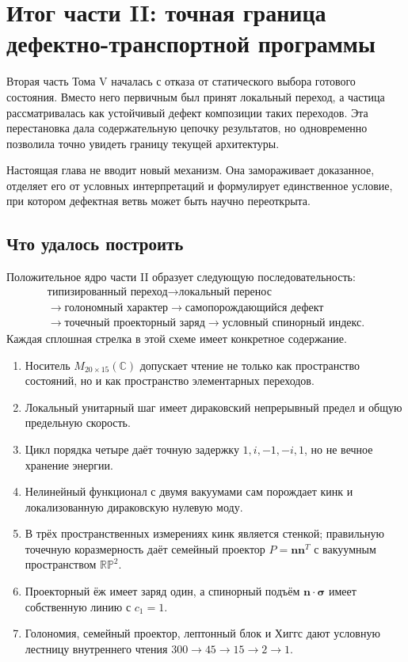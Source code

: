 \chapter{Итог части II: точная граница дефектно-транспортной программы}

Вторая часть Тома V началась с отказа от статического выбора готового
состояния. Вместо него первичным был принят локальный переход, а частица
рассматривалась как устойчивый дефект композиции таких переходов. Эта
перестановка дала содержательную цепочку результатов, но одновременно
позволила точно увидеть границу текущей архитектуры.

Настоящая глава не вводит новый механизм. Она замораживает доказанное,
отделяет его от условных интерпретаций и формулирует единственное условие,
при котором дефектная ветвь может быть научно переоткрыта.

\section{Что удалось построить}

Положительное ядро части II образует следующую последовательность:
\begin{equation}
 \boxed{
 \begin{gathered}
 \text{типизированный переход}
 \longrightarrow
 \text{локальный перенос}
 \\
 \longrightarrow
 \text{голономный характер}
 \longrightarrow
 \text{самопорождающийся дефект}
 \\
 \longrightarrow
 \text{точечный проекторный заряд}
 \longrightarrow
 \text{условный спинорный индекс}.
 \end{gathered}}
 \label{eq:v5-part-conclusion-chain}
\end{equation}
Каждая сплошная стрелка в этой схеме имеет конкретное содержание.

\begin{enumerate}
 \item Носитель $M_{20\times15}(\mathbb C)$ допускает чтение не только как
 пространство состояний, но и как пространство элементарных переходов.
 \item Локальный унитарный шаг имеет дираковский непрерывный предел и общую
 предельную скорость.
 \item Цикл порядка четыре даёт точную задержку
 $1,i,-1,-i,1$, но не вечное хранение энергии.
 \item Нелинейный функционал с двумя вакуумами сам порождает кинк и
 локализованную дираковскую нулевую моду.
 \item В трёх пространственных измерениях кинк является стенкой; правильную
 точечную коразмерность даёт семейный проектор
 $P=\mathbf n\mathbf n^T$ с вакуумным пространством $\mathbb{RP}^2$.
 \item Проекторный ёж имеет заряд один, а спинорный подъём
 $\mathbf n\cdot\boldsymbol\sigma$ имеет собственную линию с $c_1=1$.
 \item Голономия, семейный проектор, лептонный блок и Хиггс дают условную
 лестницу внутреннего чтения $300\to45\to15\to2\to1$.
\end{enumerate}

